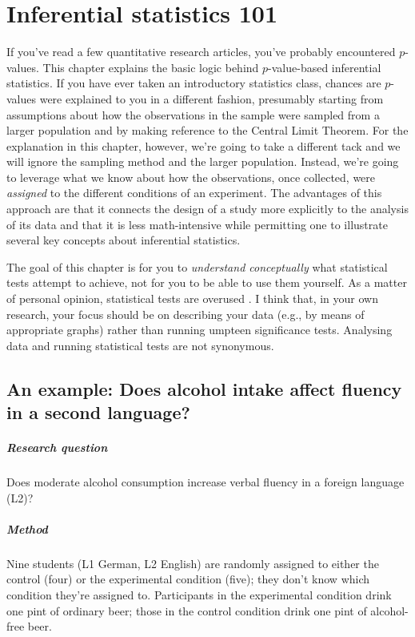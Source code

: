 \documentclass[a4paper]{tufte-book}\usepackage[]{graphicx}\usepackage[]{xcolor}
\begin{document}
\chapter{Inferential statistics 101}\label{ch:stats}
If you've read a few quantitative research articles,
you've probably encountered $p$-values.
This chapter explains the basic logic
behind $p$-value-based inferential statistics.
If you have ever taken an introductory
statistics class, chances are $p$-values were explained to you
in a different fashion, presumably starting from assumptions about
how the observations in the sample were sampled from a larger
population and by making reference to the Central Limit Theorem.
For the explanation in this chapter, however, we're going to take
a different tack and we will ignore the sampling method and
the larger population.
Instead, we're going to leverage what we know about how the
observations, once collected, were \emph{assigned} to the different
conditions of an experiment. The advantages of this approach
are that it connects the design of a study more explicitly to the analysis of its data
and that it is less math-intensive while permitting one
to illustrate several key concepts about inferential statistics.

The goal of this chapter is for you to \emph{understand conceptually} what
statistical tests attempt to achieve, not for you to be able to use them
yourself. As a matter of personal opinion, statistical tests are overused
\citep{Vanhove2020b}. I think that, in your own research,
your focus should be on describing your data (e.g., by means of
appropriate graphs) rather than running umpteen significance tests.
Analysing data and running statistical tests are not synonymous.

\section{An example: Does alcohol intake affect fluency in a second language?}
\paragraph{Research question} Does moderate alcohol consumption increase 
verbal fluency in a foreign language (L2)?

\paragraph{Method}
Nine students (L1 German, L2 English)
are randomly assigned to either the control (four) or the experimental condition (five);
they don't know which condition they're assigned to.
Participants in the experimental condition drink one pint of ordinary beer;
those in the control condition drink one pint of alcohol-free beer.
\end{document}
